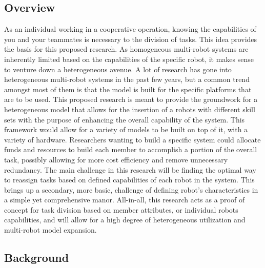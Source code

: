 \subsection{Overview}

As an individual working in a cooperative operation, knowing the capabilities
of you and your teammates is necessary to the division of tasks. This idea provides
the basis for this proposed research. As homogeneous multi-robot systems are
inherently limited based on the capabilities of the specific robot, it makes
sense to venture down a heterogeneous avenue. A lot of research has gone into
heterogeneous multi-robot systems in the past few years, but a common trend
amongst most of them is that the model is built for the specific platforms
that are to be used. This proposed research is meant to provide the groundwork
for a heterogeneous model that allows for the insertion of a robots with different
skill sets with the purpose of enhancing the overall capability of the system.
This framework would allow for a variety of models to be built on top of it,
with a variety of hardware. Researchers wanting to build a specific system
could allocate funds and resources to build each member to accomplish a portion
of the overall task, possibly allowing for more cost efficiency and remove
unnecessary redundancy. The main challenge in this research will be finding
the optimal way to reassign tasks based on defined capabilities of each robot
in the system. This brings up a secondary, more basic, challenge of defining
robot’s characteristics in a simple yet comprehensive manor. All-in-all,
this research acts as a proof of concept for task division based on member
attributes, or individual robots capabilities, and will allow for a high degree
of heterogeneous utilization and multi-robot model expansion.

\subsection{Background}

